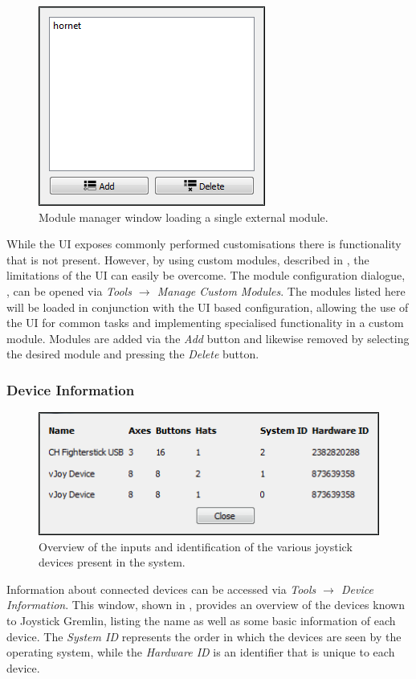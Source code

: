 \documentclass[a4, 10pt]{article}
\newcommand{\JG}{Joystick Gremlin}
\begin{document}
\begin{figure}[bt]
    \centering

    \includegraphics[width=0.3\linewidth]{images/module_manager}
    \caption{Module manager window loading a single external module.}
    \label{fig:custom_module}
\end{figure}

While the UI exposes commonly performed customisations there is
functionality that is not present. However, by using custom modules,
described in , the limitations of the UI can
easily be overcome. The module configuration dialogue,
, can be opened via \emph{Tools $\rightarrow$
Manage Custom Modules}. The modules listed here will be loaded in
conjunction with the UI based configuration, allowing the use of the UI
for common tasks and implementing specialised functionality in a custom
module. Modules are added via the \emph{Add} button and likewise removed
by selecting the desired module and pressing the \emph{Delete} button.


\subsubsection{Device Information}

\begin{figure}[bt]
    \centering

    \includegraphics[width=0.75\linewidth]{images/device_information}
    \caption{Overview of the inputs and identification of the various
        joystick devices present in the system.}
    \label{fig:device_information}
\end{figure}

Information about connected devices can be accessed via \emph{Tools
$\rightarrow$ Device Information}. This window, shown in
, provides an overview of the devices known
to \JG{}, listing the name as well as some basic information of each
device. The \emph{System ID} represents the order in which the devices
are seen by the operating system, while the \emph{Hardware ID} is an
identifier that is unique to each device.
\end{document}
